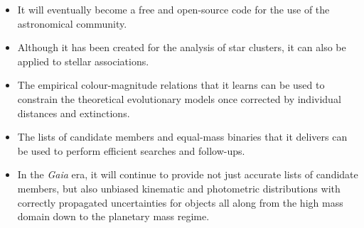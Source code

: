 \begin{itemize}
\item It will eventually become a free and open-source code for the use of the astronomical community.
\item Although it has been created for the analysis of star clusters, it can also be applied to stellar associations.
\item The empirical colour-magnitude relations that it learns can be used to constrain the theoretical evolutionary models once corrected by individual distances and extinctions.
\item The lists of candidate members and equal-mass binaries that it delivers can be used to perform efficient searches and follow-ups.
\item In the \emph{Gaia} era, it will continue to provide not just accurate lists of candidate members, but also unbiased kinematic and photometric distributions with correctly propagated uncertainties for objects all along from the high mass domain down to the planetary mass regime.
\end{itemize}







